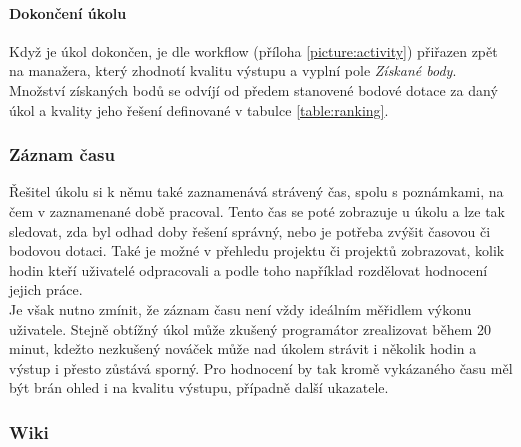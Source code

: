 \paragraph{Dokončení úkolu}

Když je úkol dokončen, je dle workflow (příloha \ref{picture:activity}) přiřazen zpět na manažera, který zhodnotí kvalitu výstupu a vyplní pole \emph{Získané body}. Množství získaných bodů se odvíjí od předem stanovené bodové dotace za daný úkol a kvality jeho řešení definované v tabulce \ref{table:ranking}. 

\subsubsection{Záznam času} \label{redmine:time}

Řešitel úkolu si k němu také zaznamenává strávený čas, spolu s poznámkami, na čem v zaznamenané době pracoval. Tento čas se poté zobrazuje u úkolu a lze tak sledovat, zda byl odhad doby řešení správný, nebo je potřeba zvýšit časovou či bodovou dotaci. Také je možné v přehledu projektu či projektů zobrazovat, kolik hodin kteří uživatelé odpracovali a podle toho například rozdělovat hodnocení jejich práce.\\
Je však nutno zmínit, že záznam času není vždy ideálním měřidlem výkonu uživatele. Stejně obtížný úkol může zkušený programátor zrealizovat během 20 minut, kdežto nezkušený nováček může nad úkolem strávit i několik hodin a výstup i přesto zůstává sporný. Pro hodnocení by tak kromě vykázaného času měl být brán ohled i na kvalitu výstupu, případně další ukazatele.

\subsubsection{Wiki}


